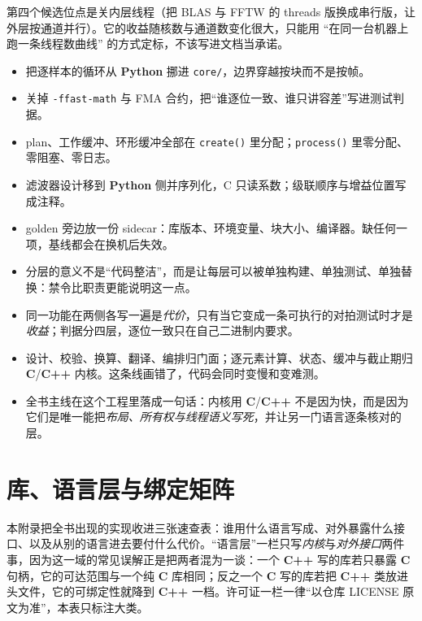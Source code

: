\documentclass[12pt,a4paper,fontset=fandol]{ctexbook}
\newcommand{\Fn}[1]{\texttt{#1()}}
\newcommand{\Tp}[1]{\texttt{#1}}
\newcommand{\Bk}{\allowbreak}
\newcommand{\Lang}[1]{\textsf{\bfseries #1}}
\newcommand{\CL}{\Lang{C}}
\newcommand{\CPP}{\Lang{C++}}
\newcommand{\PY}{\Lang{Python}}
\begin{document}
第四个候选位点是关内层线程（把 BLAS 与 FFTW 的 threads 版换成串行版，让外层按通道并行）。它的收益随核数与通道数变化很大，只能用 ``在同一台机器上跑一条线程数曲线'' 的方式定标，不该写进文档当承诺。

\begin{bestpractice}[title={只改这五处}]
\begin{itemize}
\item 把逐样本的循环从 \PY{} 挪进 \Tp{core/}，边界穿越按块而不是按帧。
\item 关掉 \Tp{-ffast-math} 与 FMA 合约，把``谁逐位一致、谁只讲容差''写进测试判据。
\item plan、工作缓冲、环形缓冲全部在 \Fn{create} 里分配；\Fn{process} 里零分配、零阻塞、零日志。
\item 滤波器设计移到 \PY{} 侧并序列化，C 只读系数；级联顺序与增益位置写成注释。
\item golden 旁边放一份 sidecar：库版本、环境变量、块大小、编译器。缺任何一项，基线都会在换机后失效。
\end{itemize}
\end{bestpractice}

\begin{guideline}[title={分层与禁令：本章的收束}]
\begin{itemize}
\item 分层的意义不是``代码整洁''，而是让每层可以被单独构建、单独测试、单独替换：禁令比职责更能说明这一点。
\item 同一功能在两侧各写一遍是\emph{代价}，只有当它变成一条可执行的对拍测试时才是\emph{收益}；判据分四层，逐位一致只在自己二进制内要求。
\item 设计、校验、换算、翻译、编排归门面；逐元素计算、状态、缓冲与截止期归 \CL/{\Bk}\CPP{} 内核。这条线画错了，代码会同时变慢和变难测。
\item 全书主线在这个工程里落成一句话：内核用 \CL/{\Bk}\CPP{} 不是因为快，而是因为它们是唯一能把\emph{布局、所有权与线程语义写死}，并让另一门语言逐条核对的层。
\end{itemize}
\end{guideline}

\appendix

\chapter{库、语言层与绑定矩阵}

本附录把全书出现的实现收进三张速查表：谁用什么语言写成、对外暴露什么接口、以及从别的语言进去要付什么代价。``语言层''一栏只写\emph{内核}与\emph{对外接口}两件事，因为这一域的常见误解正是把两者混为一谈：一个 \CPP{} 写的库若只暴露 \CL{} 句柄，它的可达范围与一个纯 \CL{} 库相同；反之一个 \CL{} 写的库若把 \CPP{} 类放进头文件，它的可绑定性就降到 \CPP{} 一档。许可证一栏一律``以仓库 LICENSE 原文为准''，本表只标注大类。
\end{document}
